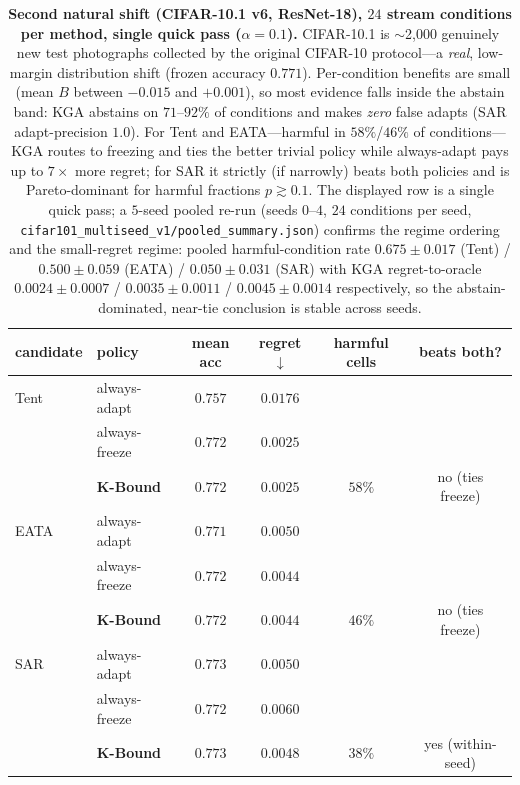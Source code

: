 \documentclass[conference]{IEEEtran}
\theoremstyle{plain}
\theoremstyle{definition}
\begin{document}
\begin{table}[t]\centering\small
\begin{tabular}{llcccc}
\toprule
candidate & policy & mean acc & regret$\downarrow$ & harmful cells & beats both? \\
\midrule
Tent & always-adapt     & $0.757$          & $0.0176$          &        & \\
     & always-freeze    & $\mathbf{0.772}$ & $\mathbf{0.0025}$ &        & \\
     & \textbf{K-Bound} & $\mathbf{0.772}$ & $\mathbf{0.0025}$ & $58\%$ & no (ties freeze) \\
\midrule
EATA & always-adapt     & $0.771$          & $0.0050$          &        & \\
     & always-freeze    & $\mathbf{0.772}$ & $\mathbf{0.0044}$ &        & \\
     & \textbf{K-Bound} & $\mathbf{0.772}$ & $\mathbf{0.0044}$ & $46\%$ & no (ties freeze) \\
\midrule
SAR  & always-adapt     & $0.773$          & $0.0050$          &        & \\
     & always-freeze    & $0.772$          & $0.0060$          &        & \\
     & \textbf{K-Bound} & $\mathbf{0.773}$ & $\mathbf{0.0048}$ & $38\%$ & yes (within-seed) \\
\bottomrule
\end{tabular}
\caption{\textbf{Second natural shift (CIFAR-10.1 v6, ResNet-18), $24$ stream conditions per
method, single quick pass ($\alpha{=}0.1$).} CIFAR-10.1 is $\sim$2{,}000 genuinely new test
photographs collected by the original CIFAR-10 protocol---a \emph{real}, low-margin
distribution shift (frozen accuracy $0.771$). Per-condition benefits are small (mean $B$
between $-0.015$ and $+0.001$), so most evidence falls inside the abstain band:
\textsc{KGA} abstains on $71$--$92\%$ of conditions and makes \emph{zero} false adapts
(SAR adapt-precision $1.0$). For Tent and EATA---harmful in $58\%$/$46\%$ of
conditions---\textsc{KGA} routes to freezing and ties the better trivial policy while
always-adapt pays up to $7\times$ more regret; for SAR it strictly (if narrowly) beats both
policies and is Pareto-dominant for harmful fractions $p\gtrsim0.1$. The displayed row is a
single quick pass; a $5$-seed pooled re-run (seeds $0$--$4$, $24$ conditions per seed,
\texttt{cifar101\_multiseed\_v1/pooled\_summary.json}) confirms the regime ordering and the
small-regret regime: pooled harmful-condition rate $0.675{\pm}0.017$ (Tent) / $0.500{\pm}0.059$
(EATA) / $0.050{\pm}0.031$ (SAR) with \textsc{KGA} regret-to-oracle $0.0024{\pm}0.0007$ /
$0.0035{\pm}0.0011$ / $0.0045{\pm}0.0014$ respectively, so the abstain-dominated, near-tie
conclusion is stable across seeds.}
\label{tab:cifar101}
\end{table}
\end{document}
